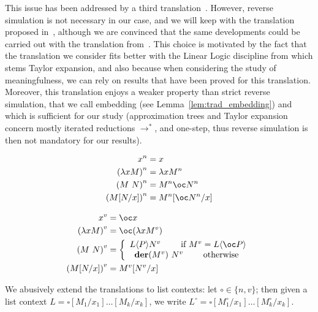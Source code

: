 \documentclass[10pt,a4paper]{article}
\newcommand{\<}{\langle}
\renewcommand{\>}{\rangle}
\newcommand{\der}[1]{\ensuremath{\mathbf{der}(#1)}}
\newcommand{\es}[2]{[#1/#2]}
\newcommand{\tradv}[1]{\ensuremath{{#1}^v}}
\newcommand{\tradn}[1]{\ensuremath{{#1}^n}}
\begin{document}
This issue has been addressed by a third translation~\cite{agk24d}.
However, reverse simulation is not necessary in our case, and we will
keep with the translation proposed in~\cite{bucciarelli2023bang},
although we are convinced that the same developments could be carried
out with the translation from~\cite{agk24d}. This choice is motivated
by the fact that the translation we consider fits better with the
Linear Logic discipline from which stems Taylor expansion, and also
because when considering the study of meaningfulness, we can rely on
results that have been proved for this translation. Moreover, this
translation enjoys a weaker property than strict reverse simulation,
that we call embedding (see Lemma~\ref{lem:trad_embedding}) and which
is sufficient for our study (approximation trees and Taylor expansion concern
mostly iterated reductions $\to^*$, and one-step, thus reverse
simulation is then not mandatory for our results).
\begin{center}
\begin{minipage}{0.30\textwidth}
\begin{align*}
	\tradn x &=  x \\
	\tradn{(\lambda x M)} &= \lambda x \tradn M \\
	\tradn{(M~N)} &= \tradn M \oc \tradn N \\
	\tradn{(M\es Nx)} &= \tradn M\es{\oc \tradn N}x
\end{align*}
\end{minipage}
\hfill
\begin{minipage}{0.30\textwidth}
\begin{align*}
	\tradv x &= \oc x \\
	\tradv{(\lambda x M)} &= \oc (\lambda x \tradv M) \\
	\tradv{(M~N)} &= \left\{
		\begin{array}{c}
		L\langle P \rangle \tradv N \qquad \text{ if } \tradv M = L \langle \oc P \rangle \\
		\der{\tradv M}~\tradv N \qquad \text{ otherwise }
		\end{array}
	\right. \\
	\tradv{(M\es Nx)} &= \tradv M\es{\tradv N}x
\end{align*}
\end{minipage}
\end{center}

We abusively extend the translations to list contexts: let
$\circ\in\{n,v\}$; then given a list context
$L=\square[M_1/x_1]\dots [M_k/x_k]$, we write
$L^\circ=\square[M_1^\circ/x_1]\dots [M_k^\circ/x_k]$.
\end{document}

